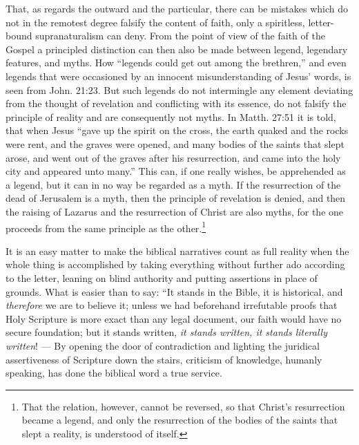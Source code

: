 \documentclass[12pt,a4paper,openany]{book}
\newcommand{\opage}[1]{\marginnote{\footnotesize\textit{[#1]}}}
\begin{document}
That, as regards the outward and the particular, there can
be mistakes which do not in the remotest degree falsify
the content of faith, only a spiritless, letter-bound supranaturalism
can deny. From the point of view of the faith of the Gospel
a principled distinction can then also be made between legend,
legendary features, and myths. How ``legends could get
out among the brethren,'' and even legends that were
occasioned by an innocent misunderstanding of Jesus' words,
is seen from John. 21:23. But such legends do not intermingle
any element deviating from the thought of revelation and conflicting with its essence,
do not falsify the principle of reality
and are consequently not myths. In Matth. 27:51 it is told,
\setcounter{footnote}{0}%
\opage{37}that when Jesus ``gave up the spirit on the cross, the earth quaked
and the rocks were rent, and the graves were opened, and many
bodies of the saints that slept arose, and went out
of the graves after his resurrection, and came into the
holy city and appeared unto many.'' This can,
if one really wishes, be apprehended as a legend, but it can
in no way be regarded as a myth. If the resurrection
of the dead of Jerusalem is a myth, then the principle of revelation is
denied, and then the raising of Lazarus and
the resurrection of Christ are also myths, for the one proceeds
from the same principle as the other.\footnote[1]{That the relation, however, cannot be reversed, so that Christ's resurrection became a legend, and only the resurrection of the bodies of the saints that slept a reality, is understood of itself.}

It is an easy matter to make the biblical narratives
count as full reality when the whole thing is accomplished
by taking everything without further ado according to the letter,
leaning on blind authority and putting assertions in place of
grounds. What is easier than to say: ``It stands in the
Bible, it is historical, and \emph{therefore} we are to believe it;
unless we had beforehand irrefutable proofs that
Holy Scripture is more exact than any legal document,
our faith would have no secure foundation; but it
stands written, \emph{it stands written, it stands literally
written}! --- By opening the door of contradiction and
lighting the juridical assertiveness of Scripture down the stairs,
criticism of knowledge, humanly speaking, has done the biblical word a true
service.
\end{document}
